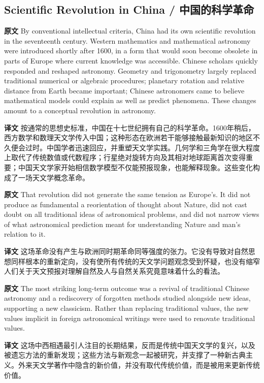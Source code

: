 \documentclass[UTF8,zihao=-4]{ctexart}
\newcommand{\BodyFont}{\fontsize{10.5pt}{15.5pt}\selectfont}
\newcommand{\origlabel}{\textbf{原文}\quad}
\newcommand{\translabel}{\textbf{译文}\quad}
\newenvironment{enblock}{\par\noindent\begingroup\BodyFont\origlabel}{\par\endgroup}
\newenvironment{zhblock}{\par\noindent\begingroup\BodyFont\translabel}{\par\endgroup\vspace{0.35em}}
\begin{document}
\subsection*{Scientific Revolution in China / 中国的科学革命}

\begin{enblock}
By conventional intellectual criteria, China had its own scientific revolution in the seventeenth century. Western mathematics and mathematical astronomy were introduced shortly after 1600, in a form that would soon become obsolete in parts of Europe where current knowledge was accessible. Chinese scholars quickly responded and reshaped astronomy. Geometry and trigonometry largely replaced traditional numerical or algebraic procedures; planetary rotation and relative distance from Earth became important; Chinese astronomers came to believe mathematical models could explain as well as predict phenomena. These changes amount to a conceptual revolution in astronomy.
\end{enblock}
\begin{zhblock}
按通常的思想史标准，中国在十七世纪拥有自己的科学革命。1600年稍后，西方数学和数理天文学传入中国；这种形态在欧洲若干能够接触最新知识的地区不久便会过时。中国学者迅速回应，并重塑天文学实践。几何学和三角学在很大程度上取代了传统数值或代数程序；行星绝对旋转方向及其相对地球距离首次变得重要；中国天文学家开始相信数学模型不仅能预报现象，也能解释现象。这些变化构成了一场天文学概念革命。
\end{zhblock}

\begin{enblock}
That revolution did not generate the same tension as Europe's. It did not produce as fundamental a reorientation of thought about Nature, did not cast doubt on all traditional ideas of astronomical problems, and did not narrow views of what astronomical prediction meant for understanding Nature and man's relation to it.
\end{enblock}
\begin{zhblock}
这场革命没有产生与欧洲同时期革命同等强度的张力。它没有导致对自然思想同样根本的重新定向，没有使所有传统的天文学问题观念受到怀疑，也没有缩窄人们关于天文预报对理解自然及人与自然关系究竟意味着什么的看法。
\end{zhblock}

\begin{enblock}
The most striking long-term outcome was a revival of traditional Chinese astronomy and a rediscovery of forgotten methods studied alongside new ideas, supporting a new classicism. Rather than replacing traditional values, the new values implicit in foreign astronomical writings were used to renovate traditional values.
\end{enblock}
\begin{zhblock}
这场中西相遇最引人注目的长期结果，反而是传统中国天文学的复兴，以及被遗忘方法的重新发现；这些方法与新观念一起被研究，并支撑了一种新古典主义。外来天文学著作中隐含的新价值，并没有取代传统价值，而是被用来更新传统价值。
\end{zhblock}
\end{document}

